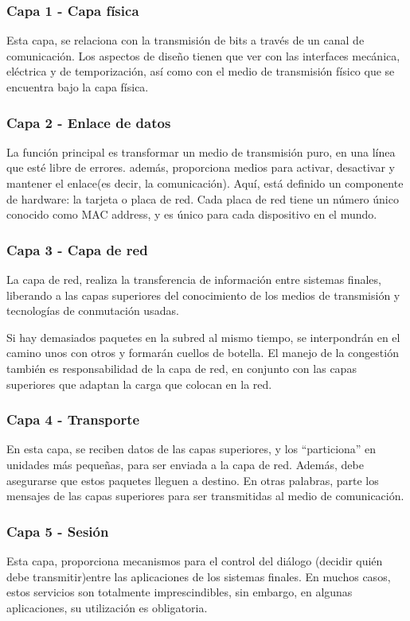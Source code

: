\subsubsection{Capa 1 - Capa física} 
Esta capa, se relaciona con la transmisión de bits a través de un canal de comunicación. Los aspectos de diseño tienen que ver con las interfaces mecánica, eléctrica y de temporización, así como con el medio de transmisión físico que se encuentra bajo la capa física.


\subsubsection{Capa 2 - Enlace de datos } 
La función principal es transformar un medio de transmisión puro, en una línea que esté libre de errores. además, proporciona medios para activar, desactivar y mantener el enlace(es decir, la comunicación). Aquí, está definido un componente de hardware: la tarjeta o placa de red. Cada placa de red tiene un número único conocido como MAC address, y es único para cada dispositivo en el mundo. 

\subsubsection{Capa 3 - Capa de red}
La capa de red, realiza la transferencia de información entre sistemas finales, liberando a las capas superiores del conocimiento de los medios de transmisión y tecnologías de conmutación usadas. 

Si hay demasiados paquetes en la subred al mismo tiempo, se interpondrán en el camino unos con
otros y formarán cuellos de botella. El manejo de la congestión también es responsabilidad de la capa de
red, en conjunto con las capas superiores que adaptan la carga que colocan en la red.

\subsubsection{Capa 4 - Transporte }
En esta capa, se reciben datos de las capas superiores, y los ``particiona'' en unidades más pequeñas, para ser enviada a la capa de red. Además, debe asegurarse  que estos paquetes lleguen a destino. En otras palabras, parte los mensajes de las capas superiores para ser transmitidas al medio de comunicación. 

\subsubsection{Capa 5 - Sesión  }
Esta capa, proporciona mecanismos para el control del diálogo (decidir quién debe transmitir)entre las aplicaciones de los sistemas finales. En muchos casos, estos servicios son totalmente  imprescindibles, sin embargo, en algunas aplicaciones, su utilización es obligatoria. 

